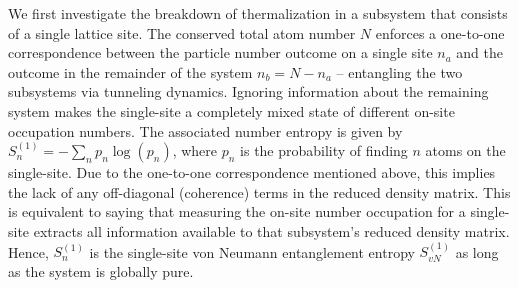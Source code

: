 We first investigate the breakdown of thermalization in a subsystem that consists of a single lattice site. The conserved total atom number $N$ enforces a one-to-one correspondence between the particle number outcome on a single site $n_a$ and the outcome in the remainder of the system $n_b=N-n_a$ -- entangling the two subsystems via tunneling dynamics. Ignoring information about the remaining system makes the single-site a completely mixed state of different on-site occupation numbers. The associated number entropy is given by $S^{(1)}_n = -\sum_n p_n \log(p_n)$, where $p_n$ is the probability of finding $n$ atoms on the single-site. Due to the one-to-one correspondence mentioned above, this implies the lack of any off-diagonal (coherence) terms in the reduced density matrix. This is equivalent to saying that measuring the on-site number occupation for a single-site extracts all information available to that subsystem's reduced density matrix. Hence, $S^{(1)}_n$ is the single-site von Neumann entanglement entropy $S^{(1)}_{vN}$ as long as the system is globally pure.

